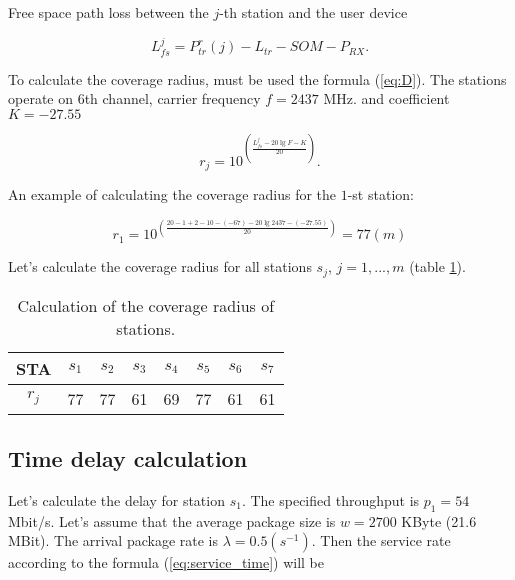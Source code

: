 Free space path loss between the $j$-th station and the user device

\begin{displaymath}
  L_{fs}^{j} = P_{tr}^r(j) - L_{tr}  - SOM - P_{RX}. 
\end{displaymath}

To calculate the coverage radius, must be used the formula (\ref{eq:D}). The stations operate on 6th channel, carrier frequency $f = 2437$ MHz. and coefficient $K = -27.55$

\begin{displaymath}
  r_{j} = 10^{\left(\frac{L_{fs}^{j} - 20\lg{F} - K}{20}\right)}.
\end{displaymath}

An example of calculating the coverage radius for the $1$-st station:

\begin{displaymath}
  r_{1} = 10^{\left(\frac{20 - 1 + 2 - 10 -(-67) - 20\lg{2437} - (-27.55)}{20}\right)} = 77 (m)
\end{displaymath}

Let's calculate the coverage radius for all stations $s_j $, $ j = 1, ..., m$ (table \ref{tab:rj}).

\begin{table}[h!]\begin{center}
  \begin{tabular}{|c||c|c|c|c|c|c|c|}\hline
      STA & $s_1$ & $s_2$ & $s_3$ & $s_4$ & $s_5$ & $s_6$ & $s_7$ \\ \hline \hline

      $r_{j}$ & 77 & 77 & 61 & 69 & 77 & 61 & 61 \\ \hline

\end{tabular}\caption{Calculation of the coverage radius of stations.}\label{tab:rj}
\end{center}\end{table}

\subsection{Time delay calculation}

Let's calculate the delay for station $s_1$. The specified throughput is $p_1 = 54$ Mbit/s. Let's assume that the average package size is $w = 2700$ KByte (21.6 MBit). The arrival package rate is $\lambda = 0.5(s^{- 1})$. Then the service rate according to the formula (\ref{eq:service_time}) will be

